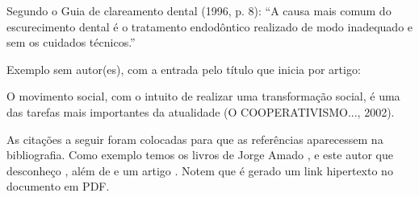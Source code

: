     Segundo o Guia de clareamento dental (1996, p. 8): ``A causa mais comum do escurecimento dental é o tratamento endodôntico realizado de modo inadequado e sem os cuidados técnicos.''

    \bigskip

    {\color{red} Exemplo sem autor(es), com a entrada pelo título que inicia por artigo:}

    \bigskip

    O movimento social, com o intuito de realizar uma transformação social, é uma das tarefas mais importantes da atualidade (O COOPERATIVISMO..., 2002).

    \bigskip

    As citações a seguir foram colocadas para que as referências aparecessem na bibliografia. Como exemplo temos os livros de Jorge Amado \cite{book:AMADO} \cite{book:AMADO2}, e este autor que desconheço \cite{book:JOHANSSON}, além de \cite{book:ENGEL} e um artigo \cite{art:PRADO}. Notem que é gerado um link hipertexto no documento em PDF.
